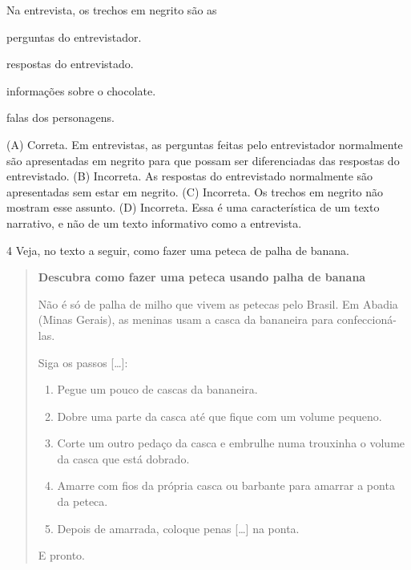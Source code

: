 Na entrevista, os trechos em negrito são as

\begin{escolha}
\item perguntas do entrevistador.

\item respostas do entrevistado.

\item informações sobre o chocolate.

\item falas dos personagens.
\end{escolha}


(A) Correta. Em entrevistas, as perguntas feitas pelo entrevistador
normalmente são apresentadas em negrito para que possam ser
diferenciadas das respostas do entrevistado.
(B) Incorreta. As respostas do entrevistado normalmente são apresentadas
sem estar em negrito.
(C) Incorreta. Os trechos em negrito não mostram esse assunto.
(D) Incorreta. Essa é uma característica de um texto narrativo, e não de
um texto informativo como a entrevista.

\num{4} Veja, no texto a seguir, como fazer uma peteca de palha de banana.

\begin{quote}
\textbf{Descubra como fazer uma peteca usando palha de banana}

Não é só de palha de milho que vivem as petecas pelo Brasil. Em Abadia
(Minas Gerais), as meninas usam a casca da bananeira para
confeccioná-las.

Siga os passos {[}\ldots{}{]}:

\begin{enumerate}
\item Pegue um pouco de cascas da bananeira.

\item Dobre uma parte da casca até que fique com um volume pequeno.

\item Corte um outro pedaço da casca e embrulhe numa trouxinha o volume da
casca que está dobrado.

\item Amarre com fios da própria casca ou barbante para amarrar a ponta da
peteca.

\item Depois de amarrada, coloque penas {[}\ldots{}{]} na ponta.
\end{enumerate}

E pronto.

\end{quote}

